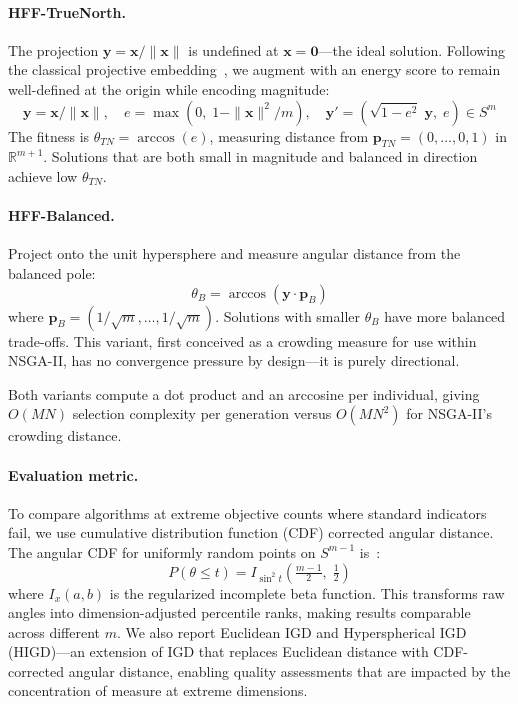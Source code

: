 \documentclass[sigconf]{acmart}
\begin{document}
\paragraph{HFF-TrueNorth.} The projection $\mathbf{y} = \mathbf{x}/\|\mathbf{x}\|$ is undefined at $\mathbf{x} = \mathbf{0}$---the ideal solution. Following the classical projective embedding~\cite{stolfi1991}, we augment with an energy score to remain well-defined at the origin while encoding magnitude:
\begin{equation}
\label{eq:truenorth}
\mathbf{y} = \mathbf{x} / \|\mathbf{x}\|, \quad
e = \max(0,\; 1 - \|\mathbf{x}\|^2\!/m), \quad
\mathbf{y}' = \left(\sqrt{1-e^2}\;\mathbf{y},\; e\right) \in S^m
\end{equation}
The fitness is $\theta_{TN} = \arccos(e)$, measuring distance from $\mathbf{p}_{TN} = (0, \ldots, 0, 1)$ in $\mathbb{R}^{m+1}$. Solutions that are both small in magnitude and balanced in direction achieve low $\theta_{TN}$.

\paragraph{HFF-Balanced.} Project onto the unit hypersphere and measure angular distance from the balanced pole:
\begin{equation}
\label{eq:balanced}
\theta_B = \arccos\!\left(\mathbf{y} \cdot \mathbf{p}_B\right)
\end{equation}
where $\mathbf{p}_B = (1/\sqrt{m}, \ldots, 1/\sqrt{m})$. Solutions with smaller $\theta_B$ have more balanced trade-offs. This variant, first conceived as a crowding measure for use within NSGA-II, has no convergence pressure by design---it is purely directional.

Both variants compute a dot product and an arccosine per individual, giving $O(MN)$ selection complexity per generation versus $O(MN^2)$ for NSGA-II's crowding distance.

\paragraph{Evaluation metric.} To compare algorithms at extreme objective counts where standard indicators fail, we use cumulative distribution function (CDF) corrected angular distance. The angular CDF for uniformly random points on $S^{m-1}$ is~\cite{cai2013angles}:
\begin{equation}
\label{eq:cdf}
P(\theta \leq t) = I_{\sin^2 t}\!\left(\tfrac{m-1}{2},\; \tfrac{1}{2}\right)
\end{equation}
where $I_x(a,b)$ is the regularized incomplete beta function. This transforms raw angles into dimension-adjusted percentile ranks, making results comparable across different $m$. We also report Euclidean IGD and Hyperspherical IGD (HIGD)---an extension of IGD that replaces Euclidean distance with CDF-corrected angular distance, enabling quality assessments that are impacted by the concentration of measure at extreme dimensions.
\end{document}
